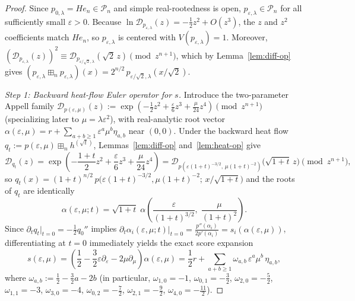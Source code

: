 \documentclass[11pt,a4paper]{article}
\theoremstyle{definition}
\newcommand{\boxplusn}{\boxplus_n}
\begin{document}
\begin{proof}
Since $p_{0,\lambda} = He_n \in \mathcal{P}_n$ and simple real-rootedness is open, $p_{\varepsilon,\lambda} \in \mathcal{P}_n$ for all sufficiently small $\varepsilon > 0$. Because $\ln \mathcal{D}_{p_{\varepsilon,\lambda}}(z) = -\frac{1}{2}z^2 + O(z^3)$, the $z$ and $z^2$ coefficients match $He_n$, so $p_{\varepsilon,\lambda}$ is centered with $V(p_{\varepsilon,\lambda}) = 1$. Moreover, $(\mathcal{D}_{p_{\varepsilon,\lambda}}(z))^2 \equiv \mathcal{D}_{p_{\varepsilon/\sqrt{2},\lambda}}(\sqrt{2}\,z) \pmod{z^{n+1}}$, which by Lemma~\ref{lem:diff-op} gives $(p_{\varepsilon,\lambda} \boxplusn p_{\varepsilon,\lambda})(x) = 2^{n/2}\,p_{\varepsilon/\sqrt{2},\lambda}(x/\sqrt{2})$.

\emph{Step 1: Backward heat-flow Euler operator for $s$.}
Introduce the two-parameter Appell family $\mathcal{D}_{p(\varepsilon,\mu)}(z) := \exp(-\frac{1}{2}z^2 + \frac{\varepsilon}{6}z^3 + \frac{\mu}{24}z^4) \pmod{z^{n+1}}$ (specializing later to $\mu = \lambda\varepsilon^2$), with real-analytic root vector $\alpha(\varepsilon,\mu) = r + \sum_{a+b \ge 1} \varepsilon^a \mu^b \eta_{a,b}$ near $(0,0)$. Under the backward heat flow $q_t := p(\varepsilon,\mu) \boxplusn h^{(\sqrt{t})}$, Lemmas~\ref{lem:diff-op} and~\ref{lem:heat-op} give
\[
\mathcal{D}_{q_t}(z) = \exp\!\left(-\frac{1+t}{2}z^2 + \frac{\varepsilon}{6}z^3 + \frac{\mu}{24}z^4\right)
= \mathcal{D}_{p(\varepsilon(1+t)^{-3/2},\,\mu(1+t)^{-2})}\bigl(\sqrt{1+t}\,z\bigr) \pmod{z^{n+1}},
\]
so $q_t(x) = (1+t)^{n/2}\,p\bigl(\varepsilon(1+t)^{-3/2}, \mu(1+t)^{-2};\, x/\sqrt{1+t}\bigr)$ and the roots of $q_t$ are identically
\[
\alpha(\varepsilon,\mu; t) = \sqrt{1+t}\;\alpha\!\left(\frac{\varepsilon}{(1+t)^{3/2}},\; \frac{\mu}{(1+t)^2}\right).
\]
Since $\partial_t q_t|_{t=0} = -\frac{1}{2}q_0''$ implies $\partial_t \alpha_i(\varepsilon,\mu; t)|_{t=0} = \frac{p''(\alpha_i)}{2p'(\alpha_i)} = s_i(\alpha(\varepsilon,\mu))$, differentiating at $t = 0$ immediately yields the exact score expansion
\[
s(\varepsilon,\mu)
= \left(\frac{1}{2} - \frac{3}{2}\varepsilon\partial_\varepsilon - 2\mu\partial_\mu\right)\alpha(\varepsilon,\mu)
= \frac{1}{2}r + \sum_{a+b \ge 1} \omega_{a,b}\,\varepsilon^a \mu^b\,\eta_{a,b},
\]
where $\omega_{a,b} := \frac{1}{2} - \frac{3}{2}a - 2b$ (in particular, $\omega_{1,0} = -1$, $\omega_{0,1} = -\frac{3}{2}$, $\omega_{2,0} = -\frac{5}{2}$, $\omega_{1,1} = -3$, $\omega_{3,0} = -4$, $\omega_{0,2} = -\frac{7}{2}$, $\omega_{2,1} = -\frac{9}{2}$, $\omega_{4,0} = -\frac{11}{2}$).


\end{proof}
\end{document}
